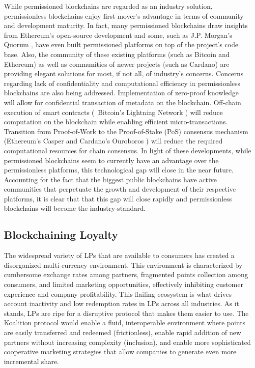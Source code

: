 While permissioned blockchains are regarded as an industry solution, permissionless blockchains enjoy first mover's advantage in terms of community and development maturity. In fact, many permissioned blockchains draw insights from Ethereum's open-source development and some, such as J.P. Morgan's Quorum \cite{Quorum16}, have even built permissioned platforms on top of the project's code base. Also, the community of these existing platforms (such as Bitcoin and Ethereum) as well as communities of newer projects (such as Cardano) are providing elegant solutions for most, if not all, of industry's concerns. Concerns regarding lack of confidentiality and computational efficiency in permissionless blockchains are also being addressed. Implementation of zero-proof knowledge will allow for confidential transaction of metadata on the blockchain. Off-chain execution of smart contracts (\eg\ Bitcoin's Lightning Network \cite{Poon16}) will reduce computation on the blockchain while enabling efficient micro-transactions. Transition from Proof-of-Work to the Proof-of-Stake (PoS) consensus mechanism (Ethereum's Casper \cite{Vitalik17} and Cardano's Ouroboros \cite{Kiayias17}) will reduce the required computational resources for chain consensus. In light of these developments, while permissioned blockchains seem to currently have an advantage over the permissionless platforms, this technological gap will close in the near future. Accounting for the fact that the biggest public blockchains have active communities that perpetuate the growth and development of their respective platforms, it is clear that that this gap will close rapidly and permissionless blockchains will become the industry-standard. 


\subsection{Blockchaining Loyalty} \label{sec:BCloyalty}
The widespread variety of LPs that are available to consumers has created a disorganized multi-currency environment. This environment is characterized by cumbersome exchange rates among partners, fragmented points collection among consumers, and limited marketing opportunities, effectively inhibiting customer experience and company profitability. This flailing ecosystem is what drives account inactivity and low redemption rates in LPs across all industries. As it stands, LPs are ripe for a disruptive protocol that makes them easier to use. The Koalition protocol would enable a fluid, interoperable environment where points are easily transferred and redeemed (frictionless), enable rapid addition of new partners without increasing complexity (inclusion), and enable more sophisticated cooperative marketing strategies that allow companies to generate even more incremental share.

